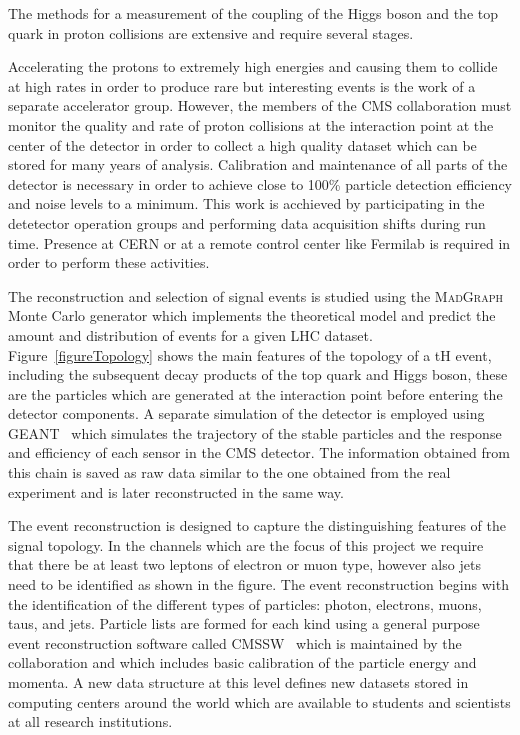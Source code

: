\documentclass[final,3p]{CSP}
\begin{document}
The methods for a measurement of the coupling of the Higgs boson and the top quark in proton collisions are extensive and require several stages.

Accelerating the protons to extremely high energies and causing them to collide at high rates in order to produce rare but interesting events is the work of a separate accelerator group.
However, the members of the CMS collaboration must monitor the quality and rate of proton collisions at the interaction point at the center of the detector in order to collect a high quality dataset which can be stored for many years of analysis.
Calibration and maintenance of all parts of the detector is necessary in order to achieve close to 100\% particle detection efficiency and noise levels to a minimum.
This work is acchieved by participating in the detetector operation groups and performing data acquisition shifts during run time.  
Presence at CERN or at a remote control center like Fermilab is required in order to perform these activities. 


The reconstruction and selection of signal events is studied using the \textsc{MadGraph}~\cite{alwall2014automated} Monte Carlo generator which implements the theoretical model and predict the amount and distribution of events for a given LHC dataset.
Figure~\ref{figureTopology} shows the main features of the topology of a tH event, including the subsequent decay products of the top quark and Higgs boson, these are the particles which are generated at the interaction point before entering the detector components.
A separate simulation of the detector is employed using \textsc{GEANT}~\cite{agostinelli2003geant4} which simulates the trajectory of the stable particles and the response and efficiency of each sensor in the CMS detector.
The information obtained from this chain is saved as raw data similar to the one obtained from the real experiment and is later reconstructed in the same way.

The event reconstruction is designed to capture the distinguishing features of the signal topology.
In the channels which are the focus of this project we require that there be at least two leptons of electron or muon type, however also jets need to be identified as shown in the figure.
The event reconstruction begins with the identification of the different types of particles: photon, electrons, muons, taus, and jets.
Particle lists are formed for each kind using a general purpose event reconstruction software called \textsc{CMSSW}~\cite{Bayatian:2006nff} which is maintained by the collaboration and which includes basic calibration of the particle energy and momenta.
A new data structure at this level defines new datasets stored in computing centers around the world which are available to students and scientists at all research institutions.
\end{document}
